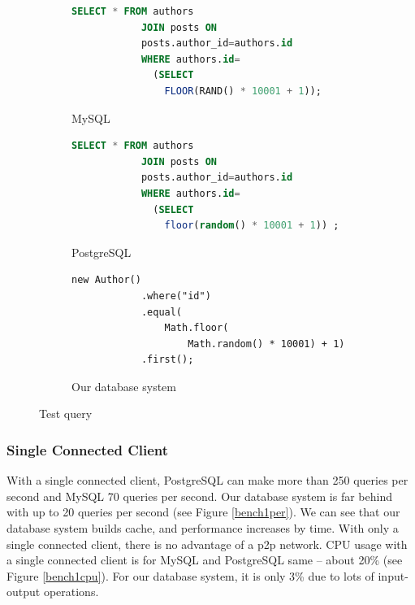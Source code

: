 \begin{figure}[h]
    \begin{subfigure}{.3\textwidth}
        \centering
        \begin{lstlisting}[language=SQL,basicstyle=\tiny]
            SELECT * FROM authors 
            JOIN posts ON 
            posts.author_id=authors.id  
            WHERE authors.id=
              (SELECT 
                FLOOR(RAND() * 10001 + 1));
        \end{lstlisting}
        \caption{MySQL}
    \end{subfigure}%
    \begin{subfigure}{.3\textwidth}
        \centering
        \begin{lstlisting}[language=SQL,basicstyle=\tiny]
            SELECT * FROM authors 
            JOIN posts ON 
            posts.author_id=authors.id  
            WHERE authors.id=
              (SELECT 
                floor(random() * 10001 + 1)) ;
        \end{lstlisting}
        \caption{PostgreSQL}
    \end{subfigure}
    \begin{subfigure}{.3\textwidth}
        \centering
        \begin{lstlisting}[style=ES6,basicstyle=\tiny]
            new Author()
            .where("id")
            .equal(
                Math.floor(
                    Math.random() * 10001) + 1)
            .first();
        \end{lstlisting}
        \caption{Our database system}
    \end{subfigure}
    \caption{Test query}
    \label{benchQuery}
\end{figure}


\subsubsection*{Single Connected Client}
With a single connected client, PostgreSQL can make more than 250 queries per second and MySQL 70 queries per second. Our database system is far behind with up to 20 queries per second (see Figure \ref{bench1per}). We can see that our database system builds cache, and performance increases by time. With only a single connected client, there is no advantage of a p2p network. CPU usage with a single connected client is for MySQL and PostgreSQL same -- about 20\% (see Figure \ref{bench1cpu}). For our database system, it is only 3\% due to lots of input-output operations. 

